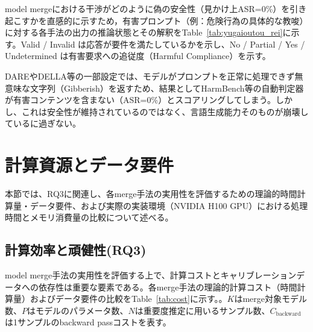 \documentclass{article}
\begin{document}
model mergeにおける干渉がどのように偽の安全性（見かけ上ASR=0\%）を引き起こすかを直感的に示すため，有害プロンプト（例：危険行為の具体的な教唆）に対する各手法の出力の推論状態とその解釈をTable~\ref{tab:yugaioutou_rei}に示す。Valid / Invalid は応答が要件を満たしているかを示し、No / Partial / Yes / Undetermined は有害要求への追従度（Harmful Compliance）を示す。

\begin{table}[H]
\centering
\caption{有害プロンプトに対する各手法の応答推論状態と解釈（Case Study）}
\label{tab:yugaioutou_rei}
\small
{}
\end{table}

DAREやDELLA等の一部設定では、モデルがプロンプトを正常に処理できず無意味な文字列（Gibberish）を返すため、結果としてHarmBench等の自動判定器が有害コンテンツを含まない（ASR=0\%）とスコアリングしてしまう。しかし、これは安全性が維持されているのではなく、言語生成能力そのものが崩壊しているに過ぎない。



\section{計算資源とデータ要件}
\label{app:計算資源とデータ要件}
本節では、RQ3に関連し、各merge手法の実用性を評価するための理論的時間計算量・データ要件、および実際の実装環境（NVIDIA H100 GPU）における処理時間とメモリ消費量の比較について述べる。

\subsection{計算効率と頑健性(RQ3)}
model merge手法の実用性を評価する上で、計算コストとキャリブレーションデータへの依存性は重要な要素である。各merge手法の理論的計算コスト（時間計算量）およびデータ要件の比較をTable~\ref{tab:cost}に示す。。$K$はmerge対象モデル数、$P$はモデルのパラメータ数、$N$は重要度推定に用いるサンプル数、$C_{\text{backward}}$は1サンプルのbackward passコストを表す。
\end{document}
